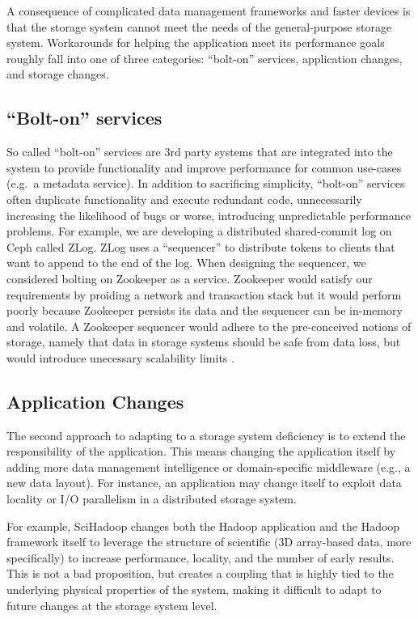\documentclass[10pt,twocolumn]{article}
\begin{document}
A consequence of complicated data management frameworks and faster
devices is that the storage system cannot meet the needs of the
general-purpose storage system. Workarounds for helping the application
meet its performance goals roughly fall into one of three categories:
``bolt-on'' services, application changes, and storage changes.

\subsection{\texorpdfstring{``Bolt-on''
services}{Bolt-on services}}\label{bolt-on-services}

So called ``bolt-on'' services are 3rd party systems that are integrated
into the system to provide functionality and improve performance for
common use-cases (e.g.~a metadata service). In addition to sacrificing
simplicity, ``bolt-on'' services often duplicate functionality and
execute redundant code, unnecessarily increasing the likelihood of bugs
or worse, introducing unpredictable performance problems. For example,
we are developing a distributed shared-commit log on Ceph called ZLog.
ZLog uses a ``sequencer'' to distribute tokens to clients that want to
append to the end of the log. When designing the sequencer, we
considered bolting on Zookeeper \cite{} as a service. Zookeeper would
satisfy our requirements by proiding a network and transaction stack but
it would perform poorly because Zookeeper persists its data and the
sequencer can be in-memory and volatile. A Zookeeper sequencer would
adhere to the pre-conceived notions of storage, namely that data in
storage systems should be safe from data loss, but would introduce
unecessary scalability limits \cite{Neha HDFS namenode example}.

\subsection{Application Changes}\label{application-changes}

The second approach to adapting to a storage system deficiency is to
extend the responsibility of the application. This means changing the
application itself by adding more data management intelligence or
domain-specific middleware (e.g., a new data layout). For instance, an
application may change itself to exploit data locality or I/O
parallelism in a distributed storage system.

For example, SciHadoop \autocites[
]{buck:hpc2011-scihadoop}{buck:sc2013-scidr} changes both the Hadoop
application and the Hadoop framework itself to leverage the structure of
scientific (3D array-based data, more specifically) to increase
performance, locality, and the number of early results. This is not a
bad proposition, but creates a coupling that is highly tied to the
underlying physical properties of the system, making it difficult to
adapt to future changes at the storage system level.
\end{document}
